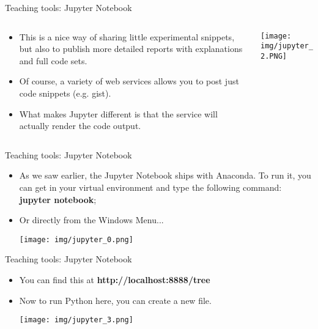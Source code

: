 \documentclass[11pt]{beamer}
\begin{document}
\begin{frame}{Teaching tools: Jupyter Notebook}
\begin{columns}[T] %
\begin{column}{.48\textwidth}
		\begin{itemize}
\item This is a nice way of sharing little experimental snippets, but also to publish more detailed reports with explanations and full code sets.  
\item Of course, a variety of web services allows you to post just code snippets (e.g. gist). 
\item What makes Jupyter different is that the service will actually render the code output.
		\end{itemize}
\end{column}%
\hfill%
\begin{column}{.48\textwidth}
		\texttt{[image: img/jupyter\_2.PNG]}
\end{column}%
\end{columns}
\end{frame}
\begin{frame}{Teaching tools: Jupyter Notebook}
\begin{itemize}
\item  As we saw earlier, the Jupyter Notebook ships with Anaconda. To run it, you can get in your virtual environment and type the following command: \textbf{jupyter notebook};
\item Or directly from the Windows Menu...
\begin{center}
\texttt{[image: img/jupyter\_0.png]} 
\end{center}
\end{itemize}
\end{frame}
\begin{frame}{Teaching tools: Jupyter Notebook}
\begin{itemize}
\item You can find this at \textbf{http://localhost:8888/tree}
\item Now to run Python here, you can create a new file. 
\begin{center}
\texttt{[image: img/jupyter\_3.png]} 
\end{center}
\end{itemize}
\end{frame}
\end{document}
